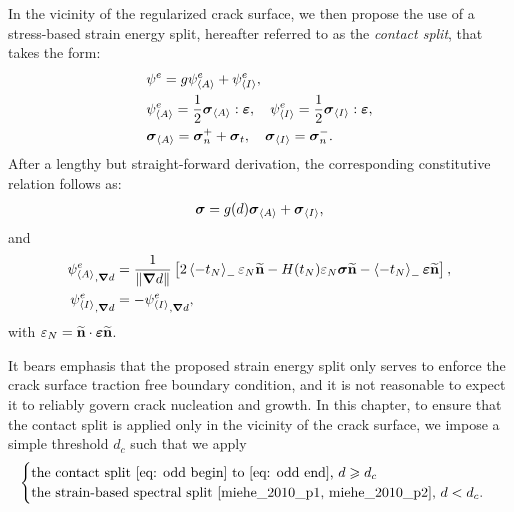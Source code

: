 In the vicinity of the regularized crack surface, we then propose the use of a stress-based strain energy split, hereafter referred to as the \textit{contact split},
that takes the form:
\begin{subequations}
  \begin{align}
     & \psi^e = g\psi^e_{\left< A \right>} + \psi^e_{\left< I \right>} , \label{eq: odd begin}                                                            \\
     & \psi^e_{\left< A \right>} = \dfrac{1}{2}\boldsymbol{\sigma}_{\left< A \right>}:\boldsymbol{\varepsilon}, \quad \psi^e_{\left< I \right>} = \dfrac{1}{2}\boldsymbol{\sigma}_{\left< I \right>}:\boldsymbol{\varepsilon} , \\
     & \boldsymbol{\sigma}_{\left< A \right>} = \boldsymbol{\sigma}_n^+ + \boldsymbol{\sigma}_t, \quad \boldsymbol{\sigma}_{\left< I \right>} = \boldsymbol{\sigma}_n^-.                                              
  \end{align}
\end{subequations}
After a lengthy but straight-forward derivation, the corresponding constitutive relation follows as:
\begin{align}
  \boldsymbol{\sigma}  = g(d)\boldsymbol{\sigma}_{\left< A \right>} + \boldsymbol{\sigma}_{\left< I \right>} , \label{eq: odd end}
\end{align}
and
\begin{subequations}
  \begin{align}
    {\psi^e_{\left< A \right>}}_{,\boldsymbol{\nabla} d}   & = \dfrac{1}{\left\lVert\boldsymbol{\nabla} d\right\rVert} \left[ 2 \left<-t_N\right>_- \varepsilon_N \widetilde{\textbf{n}} - H(t_N) \varepsilon_N \boldsymbol{\sigma}\widetilde{\textbf{n}} - \left<-t_N\right>_- \boldsymbol{\varepsilon}\widetilde{\textbf{n}} \right], \\
    {\psi^e_{\left< I \right>}}_{,\boldsymbol{\nabla} d} & = -{\psi^e_{\left< I \right>}}_{,\boldsymbol{\nabla} d},                                                                                                                             
  \end{align}
\end{subequations}
with $\varepsilon_N = \widetilde{\textbf{n}}\cdot\boldsymbol{\varepsilon}\widetilde{\textbf{n}}$.

It bears emphasis that the proposed strain energy split only serves to enforce the crack surface traction free boundary condition, and it is not reasonable to expect it to reliably govern crack nucleation and growth. In this chapter, to ensure that the contact split is applied only in the vicinity of the crack surface, we impose a simple threshold $d_c$ such that we apply
\begin{align*}
  \begin{cases}
    \text{the contact split \eqref{eq: odd begin} to \eqref{eq: odd end}, } d \geqslant d_c \\
    \text{the strain-based spectral split \cite{miehe_2010_p1, miehe_2010_p2}, } d < d_c.
  \end{cases}
\end{align*}

